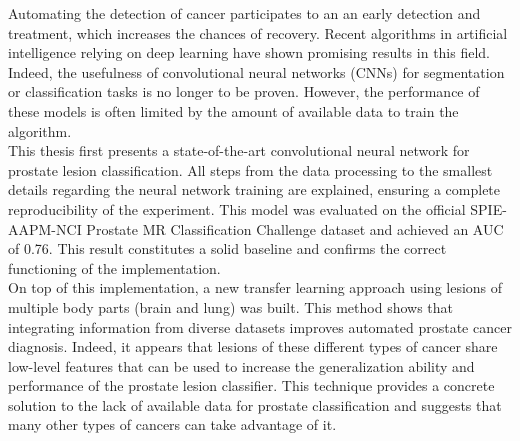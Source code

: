 
Automating the detection of cancer participates to an an early detection and treatment, which increases the chances of recovery. Recent algorithms in artificial intelligence relying on deep learning have shown promising results in this field. Indeed, the usefulness of convolutional neural networks (CNNs) for segmentation or classification tasks is no longer to be proven. However, the performance of these models is often limited by the amount of available data to train the algorithm.\\
This thesis first presents a state-of-the-art convolutional neural network for prostate lesion classification. All steps from the data processing to the smallest details regarding the neural network training are explained, ensuring a complete reproducibility of the experiment. This model was evaluated on the official SPIE-AAPM-NCI Prostate MR Classification Challenge dataset and achieved an AUC of 0.76. This result constitutes a solid baseline and confirms the correct functioning of the implementation.\\
On top of this implementation, a new transfer learning approach using lesions of multiple body parts (brain and lung) was built. This method shows that integrating information from diverse datasets improves automated prostate cancer diagnosis. Indeed, it appears that lesions of these different types of cancer share low-level features that can be used to increase the generalization ability and performance of the prostate lesion classifier. This technique provides a concrete solution to the lack of available data for prostate classification and suggests that many other types of cancers can take advantage of it.
